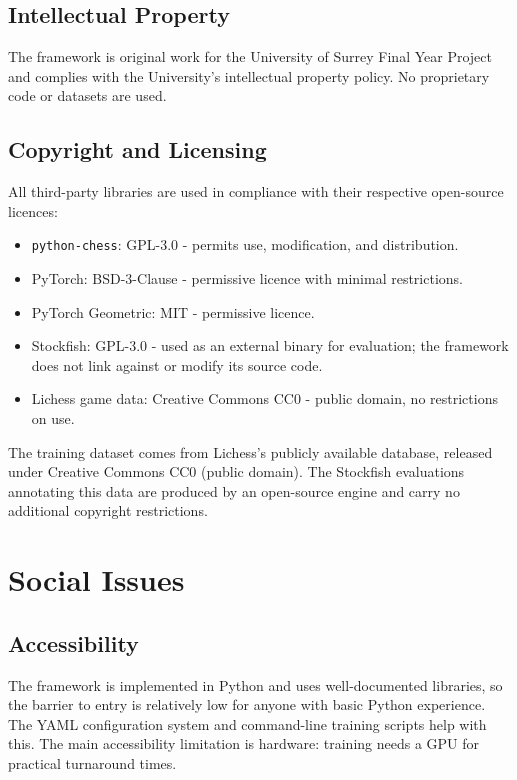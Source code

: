 \subsection{Intellectual Property}

The framework is original work for the University of Surrey Final Year Project and complies with the University's intellectual property policy. No proprietary code or datasets are used.

\subsection{Copyright and Licensing}

All third-party libraries are used in compliance with their respective open-source licences:

\begin{itemize}
    \item \texttt{python-chess}: GPL-3.0 - permits use, modification, and distribution.
    \item PyTorch: BSD-3-Clause - permissive licence with minimal restrictions.
    \item PyTorch Geometric: MIT - permissive licence.
    \item Stockfish: GPL-3.0 - used as an external binary for evaluation; the framework does not link against or modify its source code.
    \item Lichess game data: Creative Commons CC0 - public domain, no restrictions on use.
\end{itemize}

The training dataset comes from Lichess's publicly available database, released under Creative Commons CC0 (public domain). The Stockfish evaluations annotating this data are produced by an open-source engine and carry no additional copyright restrictions.

\section{Social Issues}

\subsection{Accessibility}

The framework is implemented in Python and uses well-documented libraries, so the barrier to entry is relatively low for anyone with basic Python experience. The YAML configuration system and command-line training scripts help with this. The main accessibility limitation is hardware: training needs a GPU for practical turnaround times.

